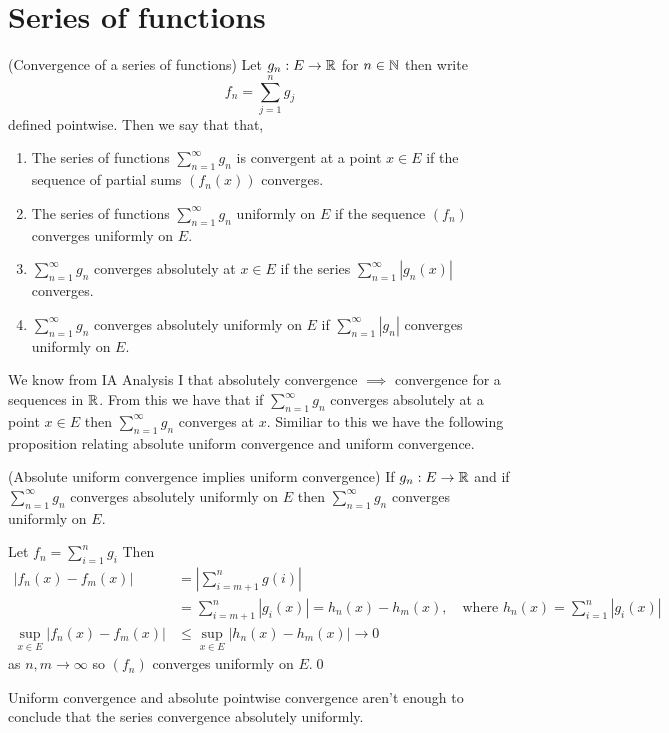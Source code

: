 \documentclass{article}
\begin{document}
\section{Series of functions}
\begin{definition}
	(Convergence of a series of functions) Let $ g_n: E\to \mathbb{R} $ for $ n\in\mathbb{N} $ then write
  \[
	  f_n=\sum_{j=1}^ng_j
  \]
  defined pointwise. Then we say that that,
  \begin{enumerate}
	  \item The series of functions $ \sum_{n=1}^\infty g_n $ is convergent at a point $ x\in E $ if the sequence of partial sums $ (f_n(x)) $ converges.
	  \item The series of functions $ \sum_{n=1}^\infty g_n $ uniformly on $ E $ if the sequence $ (f_n) $ converges uniformly on $ E $.
	  \item $ \sum_{n=1}^\infty g_n $ converges absolutely at $ x\in E $ if the series $ \sum_{n=1}^\infty |g_n(x)| $ converges.
	  \item $ \sum_{n=1}^\infty g_n $ converges absolutely uniformly on $ E $ if $ \sum_{n=1}^\infty |g_n| $ converges uniformly on $ E $.
  \end{enumerate}
\end{definition}
We know from IA Analysis I that absolutely convergence $ \implies $ convergence for a sequences in $ \mathbb{R} $. From this we have that if $ \sum_{n=1}^\infty  g_n $ converges absolutely at a point $ x\in E $ then $ \sum_{n=1}^\infty g_n $ converges at $ x $. Similiar to this we have the following proposition relating absolute uniform convergence and uniform convergence.
\begin{proposition}
	(Absolute uniform convergence implies uniform convergence) If $ g_n:E\to \mathbb{R} $ and if $ \sum_{n=1}^\infty g_n $ converges absolutely uniformly on $ E $ then $ \sum_{n=1}^\infty g_n$ converges uniformly on $ E $.
\end{proposition}
\pf Let $ f_n=\sum_{i=1}^n g_i $ Then
\begin{align*}
	|f_n(x)-f_m(x)|&=\left|\sum_{i=m+1}^ng(i)\right|\\
		       &= \sum_{i=m+1}^n|g_i(x)|=h_n(x)-h_m(x),\quad\text{where } h_n(x)=\sum_{i=1}^n|g_i(x)|\\
	\sup_{x\in E}|f_n(x)-f_m(x)|&\le \sup_{x\in E}|h_n(x)-h_m(x)|\to 0
\end{align*}
as $ n,m\to \infty $ so $ (f_n) $ converges uniformly on $ E $.\qed
\begin{remark}
  Uniform convergence and absolute pointwise convergence aren't enough to conclude that the series convergence absolutely uniformly.
\end{remark}
\end{document}
